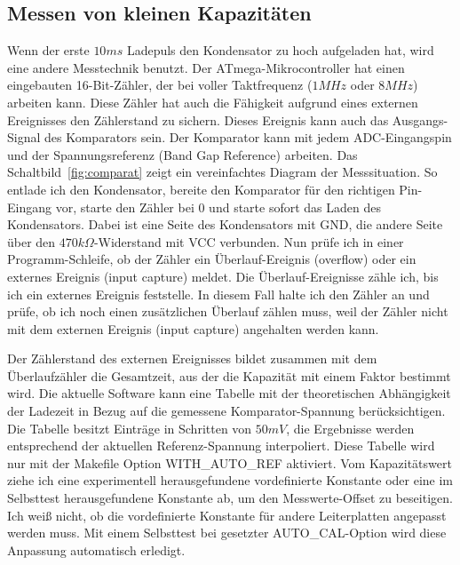 \subsection{Messen von kleinen Kapazitäten}
Wenn der erste \(10ms\) Ladepuls den Kondensator zu hoch aufgeladen hat, wird eine andere Messtechnik benutzt.
Der ATmega-Mikrocontroller hat einen eingebauten 16-Bit-Zähler, der bei voller Taktfrequenz (\(1MHz\) oder \(8MHz\)) arbeiten kann.
Diese Zähler hat auch die Fähigkeit aufgrund eines externen Ereignisses den Zählerstand zu sichern.
Dieses Ereignis kann auch das Ausgangs-Signal des Komparators sein.
Der Komparator kann mit jedem ADC-Eingangspin und der Spannungsreferenz (Band Gap Reference) arbeiten.
Das Schaltbild~\ref{fig:comparat} zeigt ein vereinfachtes Diagram der Messsituation.
So entlade ich den Kondensator, bereite den Komparator für den richtigen Pin-Eingang vor, starte den Zähler bei 0 und
starte sofort das Laden des Kondensators.
Dabei ist eine Seite des Kondensators mit GND, die andere Seite über den \(470k\Omega\)-Widerstand mit VCC verbunden.
Nun prüfe ich in einer Programm-Schleife, ob der Zähler ein Überlauf-Ereignis (overflow) oder ein
 externes Ereignis (input capture) meldet.
Die Überlauf-Ereignisse zähle ich, bis ich ein externes Ereignis feststelle.
In diesem Fall halte ich den Zähler an und prüfe, ob ich noch einen zusätzlichen Überlauf zählen muss, 
weil der Zähler nicht mit dem externen Ereignis (input capture) angehalten werden kann.


Der Zählerstand des externen Ereignisses bildet zusammen mit dem Überlaufzähler die Gesamtzeit, aus der die
Kapazität mit einem Faktor bestimmt wird.
Die aktuelle Software kann eine Tabelle mit der theoretischen Abhängigkeit der Ladezeit in Bezug auf die gemessene
Komparator-Spannung berücksichtigen.
Die Tabelle besitzt Einträge in Schritten von \(50mV\), die Ergebnisse werden entsprechend der aktuellen Referenz-Spannung interpoliert.
Diese Tabelle wird nur mit der Makefile Option WITH\_AUTO\_REF aktiviert.
Vom Kapazitätswert ziehe ich eine experimentell herausgefundene vordefinierte Konstante oder eine im Selbsttest
herausgefundene Konstante ab, um den Messwerte-Offset zu beseitigen.
Ich weiß nicht, ob die vordefinierte Konstante für andere Leiterplatten angepasst werden muss.
Mit einem Selbsttest bei gesetzter AUTO\_CAL-Option wird diese Anpassung automatisch erledigt.

